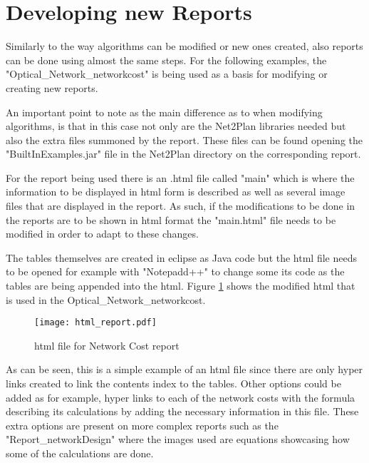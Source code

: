 	\newpage

	\section{Developing new Reports}
	Similarly to the way algorithms can be modified or new ones created, also reports can be done using almost the same steps. For the following examples, the "Optical\_Network\_networkcost" is being used as a basis for modifying or creating new reports.

	An important point to note as the main difference as to when modifying algorithms, is that in this case not only are the Net2Plan libraries needed but also the extra files summoned by the report. These files can be found opening the "BuiltInExamples.jar" file in the Net2Plan directory on the corresponding report.

	For the report being used there is an .html file called "main" which is where the information to be displayed in html form is described as well as several image files that are displayed in the report. As such, if the modifications to be done in the reports are to be shown in html format the "main.html" file needs to be modified in order to adapt to these changes.
	
	The tables themselves are created in eclipse as Java code but the html file needs to be opened for example with "Notepadd++" to change some its code as the tables are being appended into the html. Figure \ref{html_report} shows the modified html that is used in the Optical\_Network\_networkcost.
	
	\begin{figure}[h!]
		\centering
		\texttt{[image: html\_report.pdf]}
		\caption{html file for Network Cost report}
		\label{html_report}
	\end{figure}	
		
	As can be seen, this is a simple example of an html file since there are only hyper links created to link the contents index to the tables. Other options could be added as for example, hyper links to each of the network costs with the formula describing its calculations by adding the necessary information in this file. These extra options are present on more complex reports such as the "Report\_networkDesign" where the images used are equations showcasing how some of the calculations are done.
	
\clearpage
 